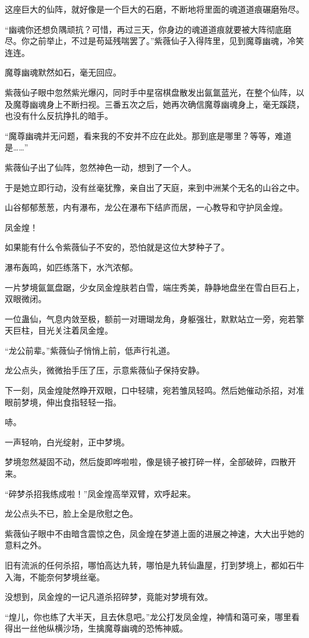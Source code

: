\begin{this_body}
这座巨大的仙阵，就好像是一个巨大的石磨，不断地将里面的魂道道痕碾磨殆尽。

“幽魂你还想负隅顽抗？可惜，再过三天，你身边的魂道道痕就要被大阵彻底磨尽。你之前举止，不过是苟延残喘罢了。”紫薇仙子入得阵里，见到魔尊幽魂，冷笑连连。

魔尊幽魂默然如石，毫无回应。

紫薇仙子眼中忽然紫光爆闪，同时手中星宿棋盘散发出氤氲蓝光，在整个仙阵，以及魔尊幽魂身上不断扫视。三番五次之后，她再次确信魔尊幽魂身上，毫无蹊跷，也没有什么反抗挣扎的暗手。

“魔尊幽魂并无问题，看来我的不安并不应在此处。那到底是哪里？等等，难道是……”

紫薇仙子出了仙阵，忽然神色一动，想到了一个人。

于是她立即行动，没有丝毫犹豫，亲自出了天庭，来到中洲某个无名的山谷之中。

山谷郁郁葱葱，内有瀑布，龙公在瀑布下结庐而居，一心教导和守护凤金煌。

凤金煌！

如果能有什么令紫薇仙子不安的，恐怕就是这位大梦种子了。

瀑布轰鸣，如匹练落下，水汽浓郁。

一片梦境氤氲盘踞，少女凤金煌肤若白雪，端庄秀美，静静地盘坐在雪白巨石上，双眼微闭。

一位蛊仙，气息内敛至极，额前一对珊瑚龙角，身躯强壮，默默站立一旁，宛若擎天巨柱，目光关注着凤金煌。

“龙公前辈。”紫薇仙子悄悄上前，低声行礼道。

龙公点头，微微抬手压了压，示意紫薇仙子保持安静。

下一刻，凤金煌陡然睁开双眼，口中轻啸，宛若雏凤轻鸣。然后她催动杀招，对准眼前梦境，伸出食指轻轻一指。

哧。

一声轻响，白光绽射，正中梦境。

梦境忽然凝固不动，然后旋即哗啦啦，像是镜子被打碎一样，全部破碎，四散开来。

“碎梦杀招我练成啦！”凤金煌高举双臂，欢呼起来。

龙公点头不已，脸上全是欣慰之色。

紫薇仙子眼中不由暗含震惊之色，凤金煌在梦道上面的进展之神速，大大出乎她的意料之外。

旧有流派的任何杀招，哪怕高达九转，哪怕是九转仙蛊屋，打到梦境上，都如石牛入海，不能奈何梦境丝毫。

没想到，凤金煌的一记凡道杀招碎梦，竟能对梦境有效。

“煌儿，你也练了大半天，且去休息吧。”龙公打发凤金煌，神情和蔼可亲，哪里看得出一丝他纵横沙场，生擒魔尊幽魂的恐怖神威。


\end{this_body}
